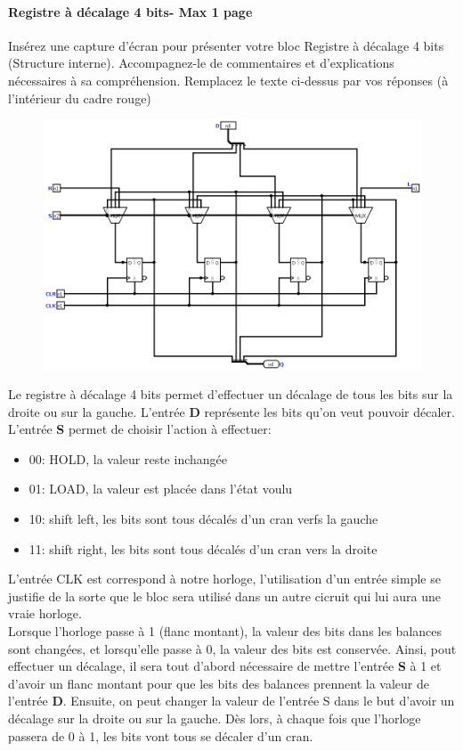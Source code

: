 \documentclass[a4paper]{article} %
\begin{document}
\begin{tcolorbox}[colframe=Monokaimagenta,colback=white]
\paragraph{Registre à décalage 4 bits- Max 1 page } %
Insérez une capture d’écran pour présenter votre bloc Registre à décalage 4 bits (Structure interne).
Accompagnez-le de commentaires et d’explications nécessaires à sa compréhension.
Remplacez le texte ci-dessus par vos réponses (à l’intérieur du cadre rouge)\\ 
\begin{figure}[H]
    \centering
    \includegraphics[width=.8\textwidth]{src/SHREGI_4BITS.png}
    \label{fig:SHREGI_4}
\end{figure}
Le registre à décalage 4 bits permet d'effectuer un décalage de tous les bits sur la droite ou sur la gauche. L'entrée \textbf{D} représente les bits qu'on veut pouvoir décaler.
L'entrée \textbf{S} permet de choisir l'action à effectuer: 
\begin{itemize}
    \item 00: HOLD, la valeur reste inchangée
    \item 01: LOAD, la valeur est placée dans l'état voulu
    \item 10: shift left, les bits sont tous décalés d'un cran verfs la gauche
    \item 11: shift right, les bits sont tous décalés d'un cran vers la droite
\end{itemize}
\vspace{1em}
L'entrée CLK est correspond à notre horloge, l'utilisation d'un entrée simple se justifie de la sorte que le bloc sera utilisé dans un autre cicruit qui lui aura une vraie horloge.\\
Lorsque l'horloge passe à 1 (flanc montant), la valeur des bits dans les balances sont changées, et lorsqu'elle passe à 0, la valeur des bits est conservée.
Ainsi, pout effectuer un décalage, il sera tout d'abord nécessaire de mettre l'entrée \textbf{S} à 1 et d'avoir un flanc montant pour que les bits des balances prennent la valeur de l'entrée \textbf{D}. Ensuite, on peut changer la valeur de l'entrée S dans le but d'avoir un décalage sur la droite ou sur la gauche. Dès lors, à chaque fois que l'horloge passera de 0 à 1, les bits vont tous se décaler d'un cran.
    

\end{tcolorbox}
\end{document}

